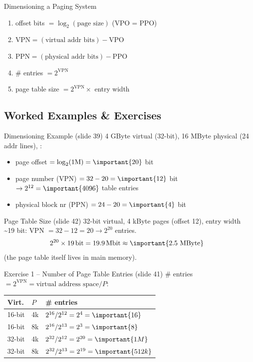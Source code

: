 \begin{KR}{Dimensioning a Paging System}
    \begin{enumerate}
        \item offset bits $= \log_2(\text{page size})$ \quad(VPO = PPO)
        \item $\text{VPN} = (\text{virtual addr bits}) - \text{VPO}$
        \item $\text{PPN} = (\text{physical addr bits}) - \text{PPO}$
        \item \# entries $= 2^{\text{VPN}}$
        \item page table size $= 2^{\text{VPN}} \times$ entry width
    \end{enumerate}
\end{KR}

\subsection{Worked Examples \& Exercises}

\begin{example2}{Dimensioning Example (slide 39)}
    4 GByte virtual (32-bit), 16 MByte physical (24 addr lines), :
    \tcblower
    \begin{itemize}
        \item page offset $= \log_2(1\text{M}) = \important{20}$ bit
        \item page number (VPN) $= 32 - 20 = \important{12}$ bit $\to 2^{12} =
              \important{4096}$ table entries
        \item physical block nr (PPN) $= 24 - 20 = \important{4}$ bit
    \end{itemize}
\end{example2}

\begin{example2}{Page Table Size (slide 42)}
    32-bit virtual, 4 kByte pages (offset 12), entry width \textasciitilde19 bit:
    \tcblower
    VPN $= 32-12 = 20 \to 2^{20}$ entries.
    $$2^{20} \times 19\,\text{bit} = 19.9\,\text{Mbit} \approx \important{2.5\ \text{MByte}}$$
    (the page table itself lives in main memory).
\end{example2}


\begin{example2}{Exercise 1 -- Number of Page Table Entries (slide 41)}
    \# entries $= 2^{\text{VPN}} = \text{virtual address space} / P$:
    \tcblower
    \begin{tabular}{l|l|l}
        Virt. & $P$ & \# entries \\\hline
        16-bit & 4k & $2^{16}/2^{12} = 2^4 = \important{16}$ \\
        16-bit & 8k & $2^{16}/2^{13} = 2^3 = \important{8}$ \\
        32-bit & 4k & $2^{32}/2^{12} = 2^{20} = \important{1M}$ \\
        32-bit & 8k & $2^{32}/2^{13} = 2^{19} = \important{512k}$ \\
    \end{tabular}
\end{example2}

